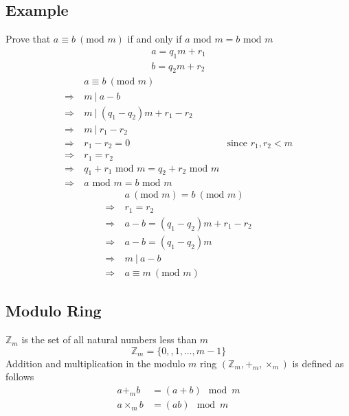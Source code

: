 \documentclass{article}
\theoremstyle{mytheoremstyle}
\theoremstyle{mytheoremstyle}
\theoremstyle{myproblemstyle}
\newcommand{\modm}[1]{\ (\text{mod }#1)}
\begin{document}
    \subsection*{Example}
    Prove that $a\equiv b \modm{m}$ if and only if $a\text{ mod }m =
    b\text{ mod }m$
    \begin{align*}
        a = q_1m+r_1 \\
        b = q_2m+r_2
    \end{align*}
    \begin{align*}
        &a\equiv b \modm{m} \\
        \Rightarrow\ & m\ |\ a-b \\
        \Rightarrow\ & m\ |\ (q_1-q_2)m + r_1-r_2 \\
        \Rightarrow\ & m\ |\ r_1-r_2 \\
        \Rightarrow\ & r_1-r_2 = 0 &\text{since } r_1,r_2<m \\
        \Rightarrow\ & r_1 = r_2 \\
        \Rightarrow\ & q_1 + r_1 \text{ mod } m = q_2 + r_2 \text{ mod } m \\
        \Rightarrow\ & a \text{ mod } m = b \text{ mod } m
    \end{align*}
    \begin{align*}
        & a\modm{m}=b\modm{m} \\
        \Rightarrow\ & r_1=r_2 \\
        \Rightarrow\ & a-b = (q_1-q_2)m+r_1-r_2 \\
        \Rightarrow\ & a-b = (q_1-q_2)m \\
        \Rightarrow\ & m\ |\ a-b \\
        \Rightarrow\ & a \equiv m \modm{m}
    \end{align*}

    \subsection*{Modulo Ring}
    $\mathbb{Z}_m$ is the set of all natural numbers less than $m$
    \[
        \mathbb{Z}_m = \{0,, 1,\dots, m-1\}
    \]
    Addition and multiplication in the modulo $m$ ring
    $(\mathbb{Z}_m,+_m,\times_m)$ is defined as follows
    \begin{align*}
        a+_mb &= (a+b) \mod m \\
        a\times_m b &= (ab) \mod m
    \end{align*}
\end{document}
